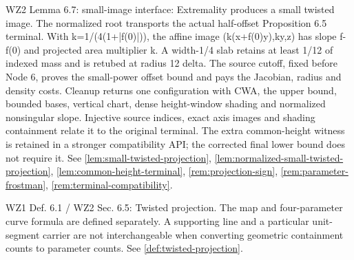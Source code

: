 \begin{remark}
\label{rem:atlas-W2L6_7}
WZ2 Lemma 6.7: small-image interface: Extremality produces a small twisted image.
The normalized root transports the actual half-offset Proposition 6.5 terminal. With k=1/(4(1+|f(0)|)), the affine image (k(x+f(0)y),ky,z) has slope f-f(0) and projected area multiplier k. A width-1/4 slab retains at least 1/12 of indexed mass and is retubed at radius 12 delta. The source cutoff, fixed before Node 6, proves the small-power offset bound and pays the Jacobian, radius and density costs. Cleanup returns one configuration with CWA, the upper bound, bounded bases, vertical chart, dense height-window shading and normalized nonsingular slope. Injective source indices, exact axis images and shading containment relate it to the original terminal. The extra common-height witness is retained in a stronger compatibility API; the corrected final lower bound does not require it.
See \ref{lem:small-twisted-projection}, \ref{lem:normalized-small-twisted-projection}, \ref{lem:common-height-terminal}, \ref{rem:projection-sign}, \ref{rem:parameter-frostman}, \ref{rem:terminal-compatibility}.
\end{remark}

\begin{remark}
\label{rem:atlas-Dtwist}
WZ1 Def. 6.1 / WZ2 Sec. 6.5: Twisted projection.
The map and four-parameter curve formula are defined separately. A supporting line and a particular unit-segment carrier are not interchangeable when converting geometric containment counts to parameter counts.
See \ref{def:twisted-projection}.
\end{remark}

